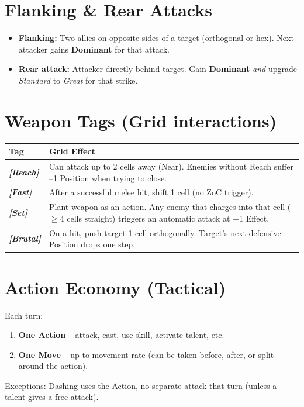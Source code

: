 \documentclass[12pt]{article}
\newcommand{\term}[1]{\textit{#1}}
\newcommand{\pos}[1]{\textbf{#1}}
\newcommand{\effect}[1]{\textit{#1}}
\begin{document}
\section{Flanking \& Rear Attacks}
\begin{itemize}[noitemsep]
    \item \textbf{Flanking:} Two allies on opposite sides of a target (orthogonal or hex). Next attacker gains \pos{Dominant} for that attack.
    \item \textbf{Rear attack:} Attacker directly behind target. Gain \pos{Dominant} \emph{and} upgrade \effect{Standard} to \effect{Great} for that strike.
\end{itemize}

\section{Weapon Tags (Grid interactions)}
\begin{tabular}{>{\bfseries}p{3cm} p{10cm}}
\toprule
\textbf{Tag} & \textbf{Grid Effect}\\
\midrule
\term{[Reach]} & Can attack up to 2 cells away (Near). Enemies without Reach suffer --1 Position when trying to close.\\
\term{[Fast]} & After a successful melee hit, shift 1 cell (no ZoC trigger).\\
\term{[Set]} & Plant weapon as an action. Any enemy that charges into that cell ($\ge4$ cells straight) triggers an automatic attack at +1 Effect.\\
\term{[Brutal]} & On a hit, push target 1 cell orthogonally. Target's next defensive Position drops one step.\\
\bottomrule
\end{tabular}

\section{Action Economy (Tactical)}
Each turn:
\begin{enumerate}[label=\arabic\textit{., leftmargin=}]
    \item \textbf{One Action} -- attack, cast, use skill, activate talent, etc.
    \item \textbf{One Move} -- up to movement rate (can be taken before, after, or split around the action).
\end{enumerate}
\noindent Exceptions: Dashing uses the Action, no separate attack that turn (unless a talent gives a free attack).
\end{document}
